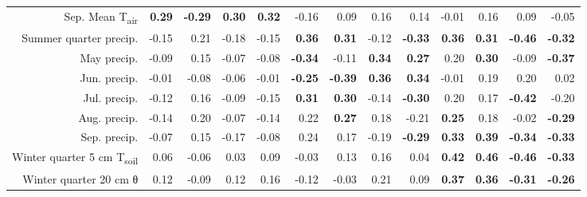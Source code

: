 \begin{table}[ht]
\begin{tabular}{rrrrrrrrrrrrr}
  Sep. Mean T\textsubscript{air} & \textbf{ 0.29 } & \textbf{ -0.29 } & \textbf{ 0.30 } & \textbf{ 0.32 } & -0.16 & 0.09 & 0.16 & 0.14 & -0.01 & 0.16 & 0.09 & -0.05 \\ 
  Summer quarter precip. & -0.15 & 0.21 & -0.18 & -0.15 & \textbf{ 0.36 } & \textbf{ 0.31 } & -0.12 & \textbf{ -0.33 } & \textbf{ 0.36 } & \textbf{ 0.31 } & \textbf{ -0.46 } & \textbf{ -0.32 } \\ 
  May precip. & -0.09 & 0.15 & -0.07 & -0.08 & \textbf{ -0.34 } & -0.11 & \textbf{ 0.34 } & \textbf{ 0.27 } & 0.20 & \textbf{ 0.30 } & -0.09 & \textbf{ -0.37 } \\ 
  Jun. precip. & -0.01 & -0.08 & -0.06 & -0.01 & \textbf{ -0.25 } & \textbf{ -0.39 } & \textbf{ 0.36 } & \textbf{ 0.34 } & -0.01 & 0.19 & 0.20 & 0.02 \\ 
  Jul. precip. & -0.12 & 0.16 & -0.09 & -0.15 & \textbf{ 0.31 } & \textbf{ 0.30 } & -0.14 & \textbf{ -0.30 } & 0.20 & 0.17 & \textbf{ -0.42 } & -0.20 \\ 
  Aug. precip. & -0.14 & 0.20 & -0.07 & -0.14 & 0.22 & \textbf{ 0.27 } & 0.18 & -0.21 & \textbf{ 0.25 } & 0.18 & -0.02 & \textbf{ -0.29 } \\ 
  Sep. precip. & -0.07 & 0.15 & -0.17 & -0.08 & 0.24 & 0.17 & -0.19 & \textbf{ -0.29 } & \textbf{ 0.33 } & \textbf{ 0.39 } & \textbf{ -0.34 } & \textbf{ -0.33 } \\ 
  Winter quarter 5 cm T\textsubscript{soil} & 0.06 & -0.06 & 0.03 & 0.09 & -0.03 & 0.13 & 0.16 & 0.04 & \textbf{ 0.42 } & \textbf{ 0.46 } & \textbf{ -0.46 } & \textbf{ -0.33 } \\ 
  Winter quarter 20 cm θ & 0.12 & -0.09 & 0.12 & 0.16 & -0.12 & -0.03 & 0.21 & 0.09 & \textbf{ 0.37 } & \textbf{ 0.36 } & \textbf{ -0.31 } & \textbf{ -0.26 } \\ 
   \hline
\end{tabular}
\end{table}
